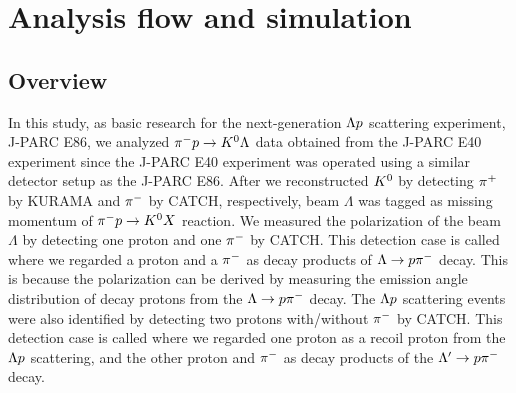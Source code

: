 %

\graphicspath{{./pictures/chapter_Anaflow/}}

\chapter{Analysis flow and simulation} 
\label{chap-Anaflow}

\section{Overview}
\label{sec-overview}
In this study, as basic research for the next-generation $\Lambda p$ scattering experiment, J-PARC E86, we analyzed $\pi^- p \to K^0 \Lambda$ data obtained from the J-PARC E40 experiment since the J-PARC E40 experiment was operated using a similar detector setup as the J-PARC E86. After we reconstructed $K^{0}$ by detecting $\pi^{+}$ by KURAMA and $\pi^{-}$ by CATCH, respectively, beam $\Lambda$ was tagged as missing momentum of $\pi^- p \to K^0 X$ reaction. We measured the polarization of the beam $\Lambda$ by detecting one proton and one $\pi^{-}$ by CATCH. This detection case is called  where we regarded a proton and a $\pi^{-}$ as decay products of $\Lambda\to p\pi^{-}$ decay. This is because the polarization can be derived by measuring the emission angle distribution of decay protons from the $\Lambda\to p\pi^{-}$ decay. The $\Lambda p$ scattering events were also identified by detecting two protons with/without $\pi^{-}$ by CATCH. This detection case is called  where we regarded one proton as a recoil proton from the $\Lambda p$ scattering, and the other proton and $\pi^{-}$ as decay products of the $\Lambda'\to p\pi^{-}$ decay. 

